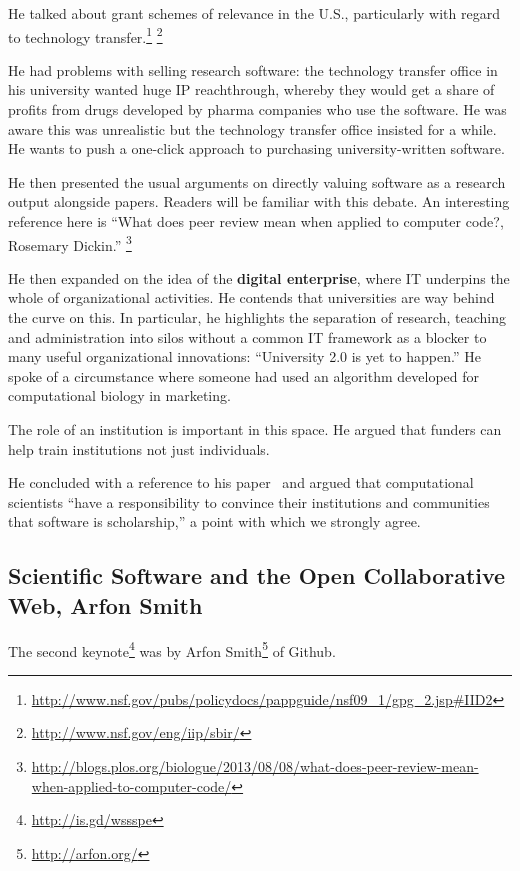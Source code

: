 \documentclass[11pt, oneside]{amsart}
\begin{document}
He talked about grant schemes of relevance in the U.S., particularly with regard to technology transfer.\footnote{\url{http://www.nsf.gov/pubs/policydocs/pappguide/nsf09_1/gpg_2.jsp\#IID2}} \footnote{\url{http://www.nsf.gov/eng/iip/sbir/}}

He had problems with selling research software: the technology transfer
office in his university wanted huge IP reachthrough, whereby they would get a
share of profits from drugs developed by pharma companies who use the
software. He was aware this was unrealistic but the technology transfer
office insisted for a
while. He wants to push a one-click approach to purchasing
university-written software. 

He then presented the usual arguments on directly valuing software as a
research output alongside papers. Readers will be familiar with this
debate. An interesting reference here is ``What
does peer review mean when applied to computer code?, Rosemary Dickin.''
\footnote{\url{http://blogs.plos.org/biologue/2013/08/08/what-does-peer-review-mean-when-applied-to-computer-code/}}

He then expanded on the idea of the \textbf{digital enterprise}, where
IT underpins the whole of organizational activities. He contends that
universities are way behind the curve on this. In particular, he
highlights the separation of research, teaching and administration into
silos without a common IT framework as a blocker to many useful
organizational innovations: ``University 2.0 is yet to happen.'' He
spoke of a circumstance where someone had used an algorithm developed
for computational biology in marketing.

The role of an institution is important in this space. He argued that
funders can help train institutions not just individuals.

He concluded with a reference to his paper~\cite{bourne_ten} and argued that computational scientists ``have a
responsibility to convince their institutions and communities that
software is scholarship,'' a point with which we strongly agree.

\subsection{Scientific Software and the Open Collaborative Web, Arfon Smith}


The second keynote\footnote{\url{http://is.gd/wssspe}} was by
 Arfon Smith\footnote{\url{http://arfon.org/}} of Github.
\end{document}
